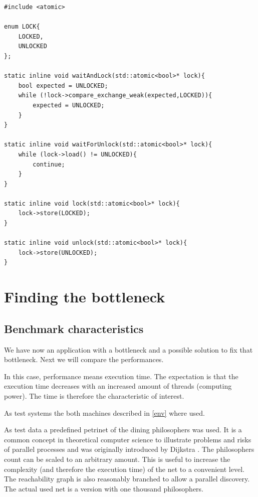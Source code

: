 \begin{lstlisting}
#include <atomic>

enum LOCK{
    LOCKED,
    UNLOCKED
};

static inline void waitAndLock(std::atomic<bool>* lock){
    bool expected = UNLOCKED;
    while (!lock->compare_exchange_weak(expected,LOCKED)){
        expected = UNLOCKED;
    }
}

static inline void waitForUnlock(std::atomic<bool>* lock){
    while (lock->load() != UNLOCKED){
        continue;
    }
}

static inline void lock(std::atomic<bool>* lock){
    lock->store(LOCKED);
}

static inline void unlock(std::atomic<bool>* lock){
    lock->store(UNLOCKED);
}
\end{lstlisting}

\section{Finding the bottleneck}
\subsection{Benchmark characteristics}
We have now an application with a bottleneck and a possible solution to fix that bottleneck. Next we will compare the performances.

In this case, performance means execution time. The expectation is that the execution time decreases with an increased amount of threads (computing power). The time is therefore the characteristic of interest.

As test systems the both machines described in \ref{env} where used.

As test data a predefined petrinet of the dining philosophers was used. It is a common concept in theoretical computer science to illustrate problems and risks of parallel processes and was originally introduced by Dijkstra \cite{dijkstra1971hierarchical}. The philosophers count can be scaled to an arbitrary amount. This is useful to increase the complexity (and therefore the execution time) of the net to a convenient level. The reachability graph is also reasonably branched to allow a parallel discovery. The actual used net is a version with one thousand philosophers.

